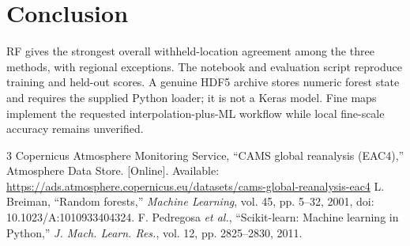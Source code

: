 \documentclass[conference]{IEEEtran}
\begin{document}
\section{Conclusion}
RF gives the strongest overall withheld-location agreement among the three methods, with regional exceptions. The notebook and evaluation script reproduce training and held-out scores. A genuine HDF5 archive stores numeric forest state and requires the supplied Python loader; it is not a Keras model. Fine maps implement the requested interpolation-plus-ML workflow while local fine-scale accuracy remains unverified.
\begin{thebibliography}{3}
 Copernicus Atmosphere Monitoring Service, ``CAMS global reanalysis (EAC4),'' Atmosphere Data Store. [Online]. Available: \url{https://ads.atmosphere.copernicus.eu/datasets/cams-global-reanalysis-eac4}
 L. Breiman, ``Random forests,'' \emph{Machine Learning}, vol. 45, pp. 5--32, 2001, doi: 10.1023/A:1010933404324.
 F. Pedregosa \emph{et al.}, ``Scikit-learn: Machine learning in Python,'' \emph{J. Mach. Learn. Res.}, vol. 12, pp. 2825--2830, 2011.
\end{thebibliography}
\end{document}
